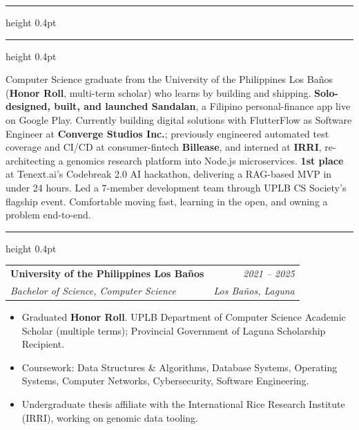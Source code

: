 \documentclass[11pt,a4paper]{article}
\makeatletter
\newcommand{\cvsection}[1]{%
  \par\addvspace{9pt}%
  \noindent{\small\bfseries\color{ink}\MakeUppercase{#1}}%
  \par\nobreak\vspace{2.5pt}%
  {\color{ink}\hrule height 0.4pt}%
  \nobreak\vspace{3pt}%
}
\newcommand{\entry}[4]{%
  \par\smallskip
  \noindent\begin{tabular*}{\linewidth}{@{\extracolsep{\fill}}l r@{}}
    \textbf{#1} & {\small\itshape\color{muted}#3} \\[-2pt]
    {\small\itshape\color{muted}#2} & {\small\itshape\color{muted}#4} \\
  \end{tabular*}\par\vspace{-2pt}
}
\makeatother
\begin{document}
\par\vspace{2pt}
\par\vspace{3pt}
\par\vspace{2pt}
\par\vspace{5pt}
{\color{ink}\hrule height 0.4pt}

\cvsection{Summary}

\noindent Computer Science graduate from the University of the Philippines Los Ba\~nos (\textbf{Honor Roll}, multi-term scholar) who learns by building and shipping. \textbf{Solo-designed, built, and launched Sandalan}, a Filipino personal-finance app live on Google Play. Currently building digital solutions with FlutterFlow as Software Engineer at \textbf{Converge Studios Inc.}; previously engineered automated test coverage and CI/CD at consumer-fintech \textbf{Billease}, and interned at \textbf{IRRI}, re-architecting a genomics research platform into Node.js microservices. \textbf{1st place} at Tenext.ai's Codebreak 2.0 AI hackathon, delivering a RAG-based MVP in under 24 hours. Led a 7-member development team through UPLB CS Society's flagship event. Comfortable moving fast, learning in the open, and owning a problem end-to-end.

\cvsection{Education}

\entry{University of the Philippines Los Ba\~nos}{Bachelor of Science, Computer Science}{2021 -- 2025}{Los Ba\~nos, Laguna}
\begin{itemize}
  \item Graduated \textbf{Honor Roll}. UPLB Department of Computer Science Academic Scholar (multiple terms); Provincial Government of Laguna Scholarship Recipient.
  \item Coursework: Data Structures \& Algorithms, Database Systems, Operating Systems, Computer Networks, Cybersecurity, Software Engineering.
  \item Undergraduate thesis affiliate with the International Rice Research Institute (IRRI), working on genomic data tooling.
\end{itemize}
\end{document}

